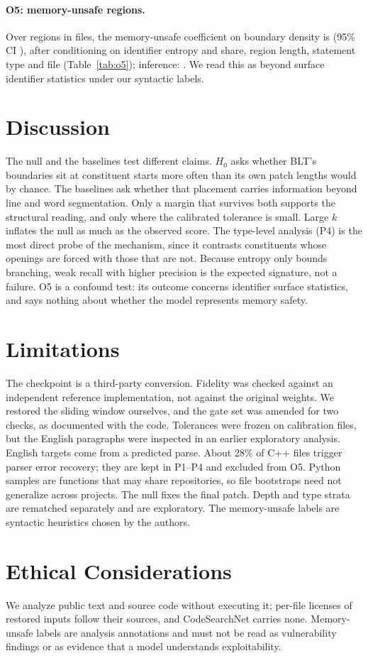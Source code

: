 \TableOFive
\paragraph{O5: memory-unsafe regions.} Over \OFiveRegions{} regions in \OFiveFiles{} files, the memory-unsafe coefficient on boundary density is \OFiveUnsafe{} (95\% CI \OFiveUnsafeCI{}), after conditioning on identifier entropy and share, region length, statement type and file (Table~\ref{tab:o5}); inference: \OFiveInference{}. We read this as \OFive{} beyond surface identifier statistics under our syntactic labels.

\section{Discussion}
The null and the baselines test different claims. $H_0$ asks whether BLT's boundaries sit at constituent starts more often than its own patch lengths would by chance. The baselines ask whether that placement carries information beyond line and word segmentation. Only a margin that survives both supports the structural reading, and only where the calibrated tolerance is small. Large $k$ inflates the null as much as the observed score. The type-level analysis (P4) is the most direct probe of the mechanism, since it contrasts constituents whose openings are forced with those that are not. Because entropy only bounds branching, weak recall with higher precision is the expected signature, not a failure. O5 is a confound test: its outcome concerns identifier surface statistics, and says nothing about whether the model represents memory safety.

\section*{Limitations}
The checkpoint is a third-party conversion. Fidelity was checked against an independent reference implementation, not against the original weights. We restored the sliding window ourselves, and the gate set was amended for two checks, as documented with the code. Tolerances were frozen on calibration files, but the English paragraphs were inspected in an earlier exploratory analysis. English targets come from a predicted parse. About 28\% of C++ files trigger parser error recovery; they are kept in P1--P4 and excluded from O5. Python samples are functions that may share repositories, so file bootstraps need not generalize across projects. The null fixes the final patch. Depth and type strata are rematched separately and are exploratory. The memory-unsafe labels are syntactic heuristics chosen by the authors.

\section*{Ethical Considerations}
We analyze public text and source code without executing it; per-file licenses of restored inputs follow their sources, and CodeSearchNet carries none. Memory-unsafe labels are analysis annotations and must not be read as vulnerability findings or as evidence that a model understands exploitability.



